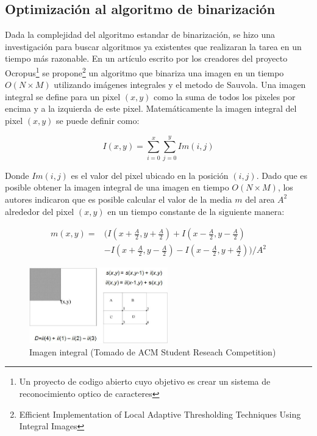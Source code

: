 \documentclass[a4paper, 11pt, oneside]{report}
\begin{document}

\subsection{Optimización al algoritmo de binarización}

Dada la complejidad del algoritmo estandar de binarización, se hizo una investigación para buscar algoritmos ya existentes que realizaran la tarea en un tiempo más razonable. En un artículo escrito por los creadores del proyecto Ocropus\footnote{Un proyecto de codigo abierto cuyo objetivo es crear un sistema de reconocimiento optico de caracteres} se propone\footnote{Efficient Implementation of Local Adaptive Thresholding Techniques Using Integral Images} un algoritmo que binariza una imagen en un tiempo $O(N \times M)$ utilizando imágenes integrales y el metodo de Sauvola. Una imagen integral se define para un pixel $(x, y)$ como la suma de todos los pixeles por encima y a la izquierda de este pixel. Matemáticamente la imagen integral del pixel $(x, y)$ se puede definir como:

\begin{equation}
	I(x, y) = \sum_{i=0}^{x}\sum_{j=0}^{y}Im(i, j)
\end{equation}

Donde $Im(i, j)$ es el valor del pixel ubicado en la posición $(i, j)$. Dado que es posible obtener la imagen integral de una imagen en tiempo $O(N \times M)$, los autores indicaron que es posible calcular el valor de la media $m$ del area $A^{2}$ alrededor del pixel $(x, y)$ en un tiempo constante de la siguiente manera:

\begin{align*}
  m(x, y) =& (I(x + \frac{A}{2}, y + \frac{A}{2}) + I(x - \frac{A}{2}, y - \frac{A}{2}) \\
	   &- I(x + \frac{A}{2}, y - \frac{A}{2}) - I(x - \frac{A}{2}, y + \frac{A}{2})) / A^{2}
\end{align*}

\begin{figure}[htb]
\begin{center}
\leavevmode
\includegraphics[width=6cm]{img/integral.png}
\end{center}
\caption{Imagen integral (Tomado de ACM Student Reseach Competition)}
\label{fig:integral}
\end{figure}
\end{document}
